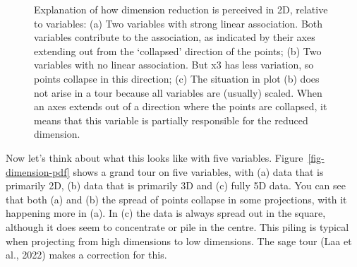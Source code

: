 \documentclass[
  letterpaper,
]{krantz}
\begin{document}
\begin{figure}


\caption{\label{fig-2D}Explanation of how dimension reduction is
perceived in 2D, relative to variables: (a) Two variables with strong
linear association. Both variables contribute to the association, as
indicated by their axes extending out from the `collapsed' direction of
the points; (b) Two variables with no linear association. But x3 has
less variation, so points collapse in this direction; (c) The situation
in plot (b) does not arise in a tour because all variables are (usually)
scaled. When an axes extends out of a direction where the points are
collapsed, it means that this variable is partially responsible for the
reduced dimension.}

\end{figure}%

Now let's think about what this looks like with five variables.
Figure~\ref{fig-dimension-pdf} shows a grand tour on five variables,
with (a) data that is primarily 2D, (b) data that is primarily 3D and
(c) fully 5D data. You can see that both (a) and (b) the spread of
points collapse in some projections, with it happening more in (a). In
(c) the data is always spread out in the square, although it does seem
to concentrate or pile in the centre. This piling is typical when
projecting from high dimensions to low dimensions. The sage tour (Laa et
al., 2022) makes a correction for this.
\end{document}
